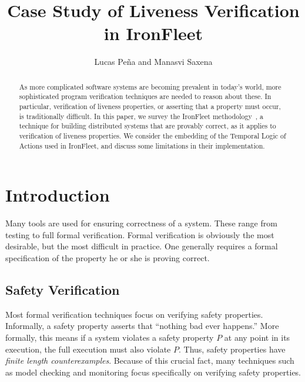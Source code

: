 \documentclass{llncs}
\begin{document}
%
\mainmatter              %
%
\title{Case Study of Liveness Verification in IronFleet}
%
\author{Lucas Pe\~{n}a and Manasvi Saxena}
%

\maketitle              %

\begin{abstract}
  As more complicated software systems are becoming prevalent in today's world,
  more sophisticated program verification techniques are needed to reason about
  these. In particular, verification of liveness properties, or asserting that a
  property must occur, is traditionally difficult. In this paper, we survey the
  IronFleet methodology~\cite{ironfleet}, a technique for building distributed
  systems that are provably correct, as it applies to verification of liveness
  properties. We consider the embedding of the Temporal Logic of Actions used in
  IronFleet, and discuss some limitations in their implementation.
\end{abstract}
%
\section{Introduction}
Many tools are used for ensuring correctness of a system. These range from
testing to full formal verification. Formal verification is obviously the most
desirable, but the most difficult in practice. One generally requires a formal
specification of the property he or she is proving correct.

\subsection{Safety Verification}
Most formal verification techniques focus on verifying safety
properties. Informally, a safety property asserts that ``nothing bad ever
happens.'' More formally, this means if a system violates a safety property $P$
at any point in its execution, the full execution must also violate $P$. Thus,
safety properties have \textit{finite length counterexamples}. Because of this
crucial fact, many techniques such as model checking and monitoring focus
specifically on verifying safety properties.
\end{document}
